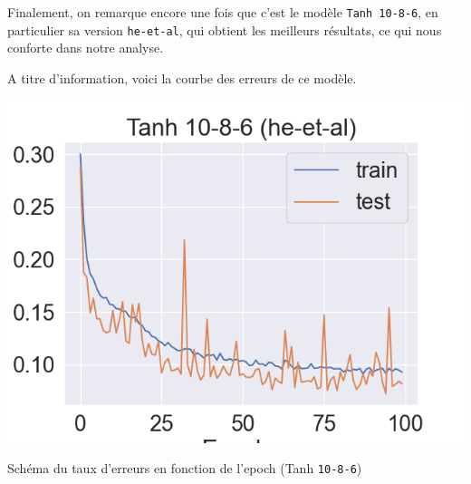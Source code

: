 Finalement, on remarque encore une fois que c'est le modèle \texttt{Tanh 10-8-6}, en particulier sa version \texttt{he-et-al}, qui obtient les meilleurs résultats, ce qui nous conforte dans notre analyse.

A titre d'information, voici la courbe des erreurs de ce modèle.

\begin{table}[H]
    \includegraphics[scale=0.6]{images/tanh-10-8-6-errors.png}
    \caption{\label{HomePage} Schéma du taux d'erreurs en fonction de l'epoch (Tanh \texttt{10-8-6})}
\end{table}